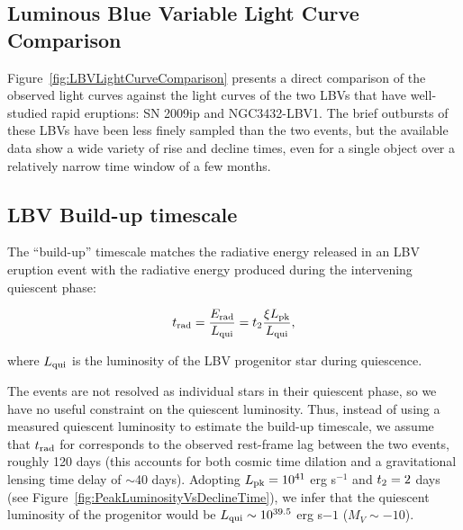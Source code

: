 \subsection{Luminous Blue Variable Light Curve Comparison}

Figure~\ref{fig:LBVLightCurveComparison} presents a direct comparison
of the observed \spock light curves against the light curves of the
two LBVs that have well-studied rapid eruptions: SN 2009ip and
NGC3432-LBV1. The brief outbursts of these LBVs have been less finely
sampled than the two \spock events, but the available data show a wide
variety of rise and decline times, even for a single object over a
relatively narrow time window of a few months.  



\subsection{LBV Build-up timescale}\label{sec:LBVbuildup}

The ``build-up'' timescale \citep{Smith:2011b} matches the radiative
energy released in an LBV eruption event with the radiative energy
produced during the intervening quiescent phase:

\begin{equation}
  \label{eqn:trad}
t_{\rm rad} = \frac{E_{\rm rad}}{L_{\rm qui}} = \t2 \frac{\xi\Lpk}{L_{\rm qui}},
\end{equation}

\noindent where $L_{\rm qui}$ is the luminosity of the LBV progenitor
star during quiescence.

The \spock events are not resolved as individual stars in their
quiescent phase, so we have no useful constraint on the quiescent
luminosity. Thus, instead of using a measured quiescent luminosity to
estimate the build-up timescale, we assume that $t_{\rm rad}$ for
\spock corresponds to the observed rest-frame lag between the two
events, roughly 120 days (this accounts for both cosmic time dilation
and a gravitational lensing time delay of $\sim$40 days). Adopting
$L_{\rm pk}=10^{41}$ erg s$^{-1}$ and $\t2=2$ days (see
Figure~\ref{fig:PeakLuminosityVsDeclineTime}), we infer that the
quiescent luminosity of the \spock progenitor would be $L_{\rm
  qui}\sim10^{39.5}$ erg s${-1}$ ($M_V\sim-10$).


